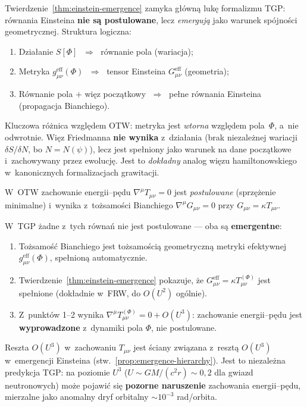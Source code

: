 \begin{remark}\label{rem:einstein-interpretation}
Twierdzenie~\ref{thm:einstein-emergence} zamyka g\l{}\'own\k{a}
luk\k{e} formalizmu TGP: r\'ownania Einsteina
\textbf{nie s\k{a} postulowane}, lecz \emph{emerguj\k{a}} jako
warunek sp\'ojno\'sci geometrycznej. Struktura logiczna:
\begin{enumerate}[nosep]
  \item Dzia\l{}anie $S[\Phi]$ $\;\Rightarrow\;$ r\'ownanie pola
        (wariacja);
  \item Metryka $g_{\mu\nu}^{\mathrm{eff}}(\Phi)$ $\;\Rightarrow\;$
        tensor Einsteina $G^{\mathrm{eff}}_{\mu\nu}$ (geometria);
  \item R\'ownanie pola $+$ wi\k{e}z pocz\k{a}tkowy $\;\Rightarrow\;$
        pe\l{}ne r\'ownania Einsteina (propagacja Bianchiego).
\end{enumerate}
Kluczowa r\'o\.znica wzgl\k{e}dem OTW: metryka jest
\emph{wtorna} wzgl\k{e}dem pola~$\Phi$, a~nie odwrotnie.
Wi\k{e}z Friedmanna \textbf{nie wynika} z~dzia\l{}ania
(brak niezale\.znej wariacji $\delta S/\delta N$,
bo $N = N(\psi)$), lecz jest spe\l{}niony jako
warunek na dane pocz\k{a}tkowe i~zachowywany
przez ewolucj\k{e}. Jest to \emph{dok\l{}adny} analog
wi\k{e}zu hamiltonowskiego w~kanonicznych formalizacjach grawitacji.

\end{remark}

\begin{remark}%
\label{rem:energy-momentum-conservation}
W~OTW zachowanie energii--p\k{e}du $\nabla^\mu T_{\mu\nu} = 0$
jest \emph{postulowane} (sprz\k{e}\.zenie minimalne) i~wynika
z~to\.zsamo\'sci Bianchiego $\nabla^\mu G_{\mu\nu} = 0$
przy $G_{\mu\nu} = \kappa T_{\mu\nu}$.

W~TGP \.zadne z~tych r\'owna\'n nie jest postulowane ---
oba s\k{a} \textbf{emergentne}:
\begin{enumerate}[nosep]
  \item To\.zsamo\'s\'c Bianchiego jest to\.zsamo\'sci\k{a}
        geometryczn\k{a} metryki efektywnej $g_{\mu\nu}^{\mathrm{eff}}(\Phi)$,
        spe\l{}nion\k{a} automatycznie.
  \item Twierdzenie~\ref{thm:einstein-emergence} pokazuje, \.ze
        $G_{\mu\nu}^{\mathrm{eff}} = \kappa T_{\mu\nu}^{(\Phi)}$
        jest spe\l{}nione (dok\l{}adnie w~FRW, do $O(U^2)$ og\'olnie).
  \item Z~punkt\'ow 1--2 wynika
        $\nabla^\mu T_{\mu\nu}^{(\Phi)} = 0 + O(U^3)$:
        zachowanie energii--p\k{e}du jest \textbf{wyprowadzone}
        z~dynamiki pola $\Phi$, nie postulowane.
\end{enumerate}
Reszta $O(U^3)$ w~zachowaniu $T_{\mu\nu}$ jest \'sciany
zwi\k{a}zana z~reszt\k{a} $O(U^3)$ w~emergencji Einsteina
(stw.~\ref{prop:emergence-hierarchy}).
Jest to niezale\.zna predykcja TGP: na poziomie $U^3$
($U \sim GM/(c^2 r) \sim 0{,}2$ dla gwiazd neutronowych)
mo\.ze pojawi\'c si\k{e} \textbf{pozorne naruszenie}
zachowania energii--p\k{e}du, mierzalne jako anomalny
dryf orbitalny $\sim 10^{-3}$ rad/orbita.
\end{remark}

